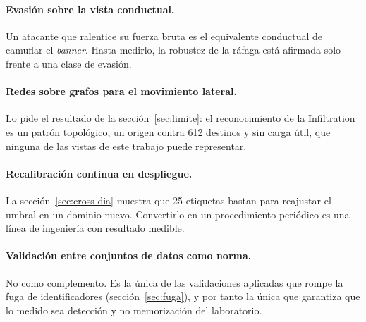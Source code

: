 \paragraph{Evasión sobre la vista conductual.} Un atacante que ralentice su
fuerza bruta es el equivalente conductual de camuflar el \emph{banner}. Hasta
medirlo, la robustez de la ráfaga está afirmada solo frente a una clase de
evasión.

\paragraph{Redes sobre grafos para el movimiento lateral.} Lo pide el resultado
de la sección~\ref{sec:limite}: el reconocimiento de la Infiltration es un
patrón topológico, un origen contra 612 destinos y sin carga útil, que ninguna
de las vistas de este trabajo puede representar.

\paragraph{Recalibración continua en despliegue.} La
sección~\ref{sec:cross-dia} muestra que 25 etiquetas bastan para reajustar el
umbral en un dominio nuevo. Convertirlo en un procedimiento periódico es una
línea de ingeniería con resultado medible.

\paragraph{Validación entre conjuntos de datos como norma.} No como
complemento. Es la única de las validaciones aplicadas que rompe la fuga de
identificadores (sección~\ref{sec:fuga}), y por tanto la única que garantiza que
lo medido sea detección y no memorización del laboratorio.
